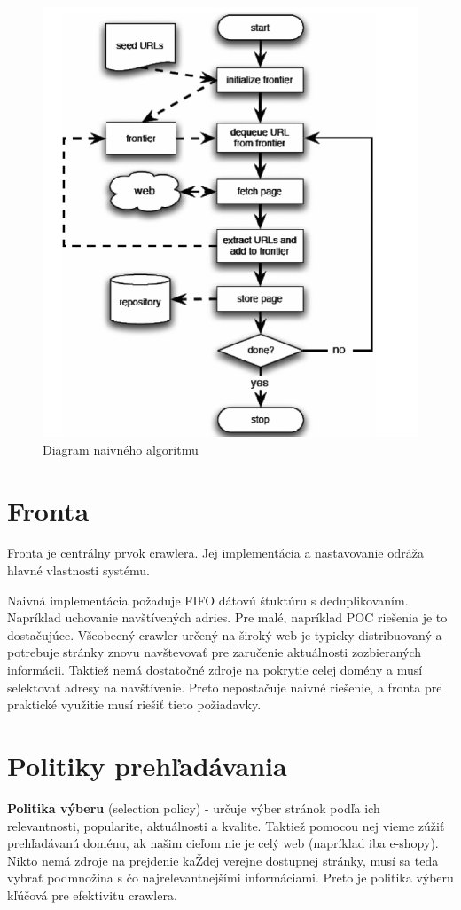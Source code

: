 \begin{figure}[!ht]
    \centering
    \includegraphics[width=.9\textwidth]{figures/basicCrawlAlgorithm.png}
    \caption{Diagram naivného algoritmu \label{o:basic_crawl_algorithm} \cite{dataMining}}
\end{figure}

\section{Fronta} 
Fronta je centrálny prvok crawlera. Jej implementácia a nastavovanie odráža hlavné vlastnosti systému. 

Naivná implementácia požaduje FIFO dátovú štuktúru s deduplikovaním. Napríklad uchovanie navštívených adries. Pre malé, napríklad POC riešenia je to dostačujúce. 
Všeobecný crawler určený na široký web je typicky distribuovaný a potrebuje stránky znovu navštevovať pre zaručenie aktuálnosti zozbieraných informácii. Taktiež nemá dostatočné zdroje na pokrytie celej domény a musí selektovať adresy na navštívenie. Preto nepostačuje naivné riešenie, a fronta pre praktické využitie musí riešiť tieto požiadavky. 

\section{Politiky prehľadávania}
\textbf{Politika výberu} (selection policy) - určuje výber stránok podľa ich relevantnosti, popularite, aktuálnosti a kvalite. Taktiež pomocou nej vieme zúžiť prehľadávanú doménu, ak našim cieľom nie je celý web (napríklad iba e-shopy). Nikto nemá zdroje na prejdenie kaŽdej verejne dostupnej stránky, musí sa teda vybrať podmnožina s čo najrelevantnejšími informáciami. Preto je politika výberu kľúčová pre efektivitu crawlera. 

